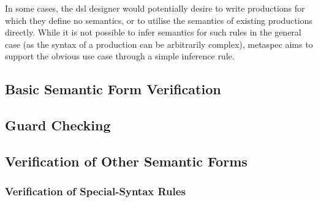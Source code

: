 In some cases, the \gls{dsl} designer would potentially desire to write productions for which they define no semantics, or to utilise the semantics of existing productions directly.
While it is not possible to infer semantics for such rules in the general case (as the syntax of a production can be arbitrarily complex), \gls{metaspec} aims to support the obvious use case through a simple inference rule. 


\subsection{Basic Semantic Form Verification} %
\label{sub:basic_semantic_form_verification}


\subsection{Guard Checking} %
\label{sub:guard_checking}


\subsection{Verification of Other Semantic Forms} %
\label{sub:verification_of_other_semantic_forms}

\subsubsection{Verification of Special-Syntax Rules} %
\label{ssub:verification_of_special_syntax_rules}

